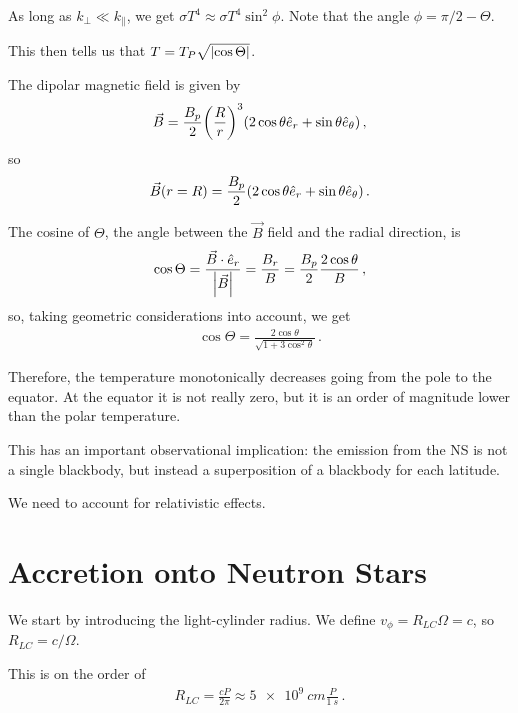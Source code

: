 \documentclass[main.tex]{subfiles}
\begin{document}
As long as \(k_\perp \ll k_\parallel\), we get \(\sigma T^{4} \approx \sigma T^{4} \sin^2 \phi \). Note that the angle \(\phi = \pi /2 - \Theta \).

This then tells us that \(T = T_P \sqrt{\abs{\cos \Theta }}\).

The dipolar magnetic field is given by 
%
\begin{align}
\vec{B} = \frac{B_p}{2} \qty(\frac{R}{r})^3 \qty(2 \cos \theta \hat{e}_r + \sin \theta \hat{e}_\theta )
\,,
\end{align}
%
so 
%
\begin{align}
\vec{B}(r = R) = \frac{B_p}{2} \qty(2 \cos \theta \hat{e}_r + \sin \theta \hat{e}_\theta )
\,.
\end{align}

The cosine of \(\Theta \), the angle between the \(\vec{B}\) field and the radial direction, is 
%
\begin{align}
\cos \Theta = \frac{\vec{B} \cdot \hat{e}_r}{\abs{\vec{B}}} = \frac{B_r}{B} = \frac{B_p}{2} \frac{2 \cos \theta }{B} 
\,,
\end{align}
%
so, taking geometric considerations into account, we get 
%
\begin{align}
\cos \Theta = \frac{2 \cos \theta }{\sqrt{1 + 3 \cos^2 \theta }}
\,.
\end{align}

Therefore, the temperature monotonically decreases going from the pole to the equator. 
At the equator it is not really zero, but it is an order of magnitude lower than the polar temperature.


This has an important observational implication: the emission from the NS is not a single blackbody, but instead a superposition of a blackbody for each latitude.

We need to account for relativistic effects.

\section{Accretion onto Neutron Stars}

We start by introducing the light-cylinder radius.
We define \(v_\phi = R_{LC} \Omega = c\), so \(R_{LC} = c/  \Omega \).

This is on the order of 
%
\begin{align}
R_{LC} = \frac{cP}{2 \pi } \approx \SI{5e9}{cm} \frac{P}{\SI{1}{s}}
\,.
\end{align}
\end{document}
